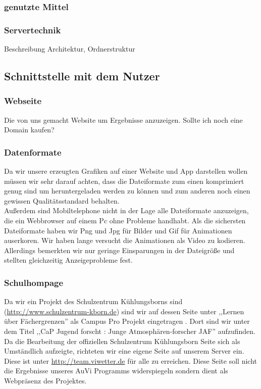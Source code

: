 \documentclass[a4paper,oneside,12pt,titlepage]{article}
\newcommand{\jf}{Jugend forscht }
\newcommand{\link}[1]{\textcolor{link}{\url{#1}}}	%
\begin{document}
\subsubsection{genutzte Mittel} %

\subsubsection{Servertechnik} %
Beschreibung Architektur, Ordnerstruktur

\subsection{Schnittstelle mit dem Nutzer} %

\subsubsection{Webseite} %
Die von uns gemacht Website um Ergebnisse anzuzeigen. Sollte ich noch eine Domain kaufen?

\subsubsection{Datenformate} %
Da wir unsere erzeugten Grafiken auf einer Website und App darstellen wollen müssen wir sehr darauf achten, dass die Dateiformate zum einen komprimiert genug sind um heruntergeladen werden zu können und zum anderen noch einen gewissen Qualitätsstandard behalten.\\
Außerdem sind Mobiltelephone nicht in der Lage alle Dateiformate anzuzeigen, die ein Webbrowser auf einem Pc ohne Probleme handhabt. Als die sichersten Dateiformate haben wir Png und Jpg für Bilder und Gif für Animationen auserkoren. Wir haben lange versucht die Animationen als Video zu kodieren. Allerdings bemerkten wir nur geringe Einsparungen in der Dateigröße und stellten gleichzeitig Anzeigeprobleme fest.

\subsubsection{Schulhompage} %
Da wir ein Projekt des Schulzentrum Kühlungsborns sind (\link{http://www.schulzentrum-kborn.de}) sind wir auf dessen Seite unter ,,Lernen über Fächergrenzen'' als Campus Pro Projekt eingetragen \cite{szkb}. Dort sind wir unter dem Titel ,,CaP \jf : Junge Atmosphären-forscher JAF'' aufzufinden. Da die Bearbeitung der offiziellen Schulzentrum Kühlungsborn Seite sich als Umständlich aufzeigte, richteten wir eine eigene Seite auf unserem Server ein. Diese ist unter \link{http://team.viwetter.de}
für alle zu erreichen. Diese Seite soll nicht die Ergebnisse unseres AuVi Programms widerspiegeln sondern dient als Webpräsenz des Projektes.
\end{document}
